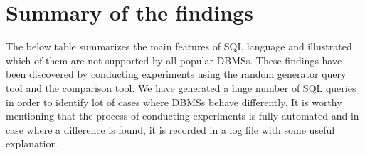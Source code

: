 \section{Summary of the findings}
 
The below table summarizes the main features of SQL language and illustrated which of them are not supported by all popular DBMSs. These findings have been discovered by conducting experiments using the random generator query tool and the comparison tool. We have generated a huge number of SQL queries in order to identify lot of cases where DBMSs behave differently. It is worthy mentioning that the process of conducting experiments is fully automated and in case where a difference is found, it is recorded in a log file with some useful explanation.    


\begin{table}[h]
\caption{Summarize results}
\label{my-label}
\end{table}
